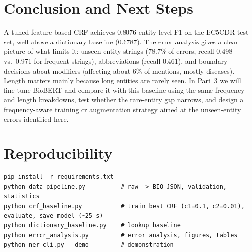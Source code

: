 \documentclass[10pt,a4paper]{article}
\begin{document}
\section{Conclusion and Next Steps}
A tuned feature-based CRF achieves 0.8076 entity-level F1 on the BC5CDR test set, well above a dictionary baseline (0.6787). The error analysis gives a clear picture of what limits it:
unseen entity strings (78.7\% of errors, recall 0.498 vs.\ 0.971 for frequent strings), abbreviations (recall 0.461), and boundary decisions about modifiers (affecting about 6\% of mentions, mostly diseases).
Length matters mainly because long entities are rarely seen. In Part~3 we will fine-tune BioBERT and compare it with this baseline using the same frequency and length breakdowns,
test whether the rare-entity gap narrows, and design a frequency-aware training or augmentation strategy aimed at the unseen-entity errors identified here.

\section*{Reproducibility}\label{sec:repro}
\begin{Verbatim}[fontsize=\footnotesize]
pip install -r requirements.txt
python data_pipeline.py          # raw -> BIO JSON, validation, statistics
python crf_baseline.py           # train best CRF (c1=0.1, c2=0.01), evaluate, save model (~25 s)
python dictionary_baseline.py    # lookup baseline
python error_analysis.py         # error analysis, figures, tables
python ner_cli.py --demo         # demonstration
\end{Verbatim}
\end{document}
